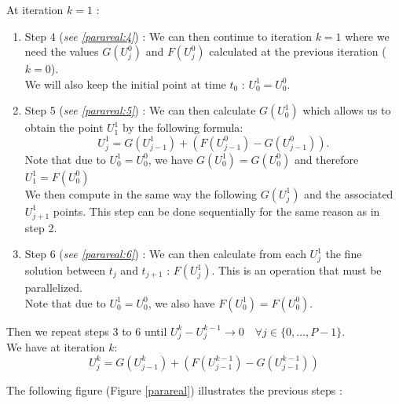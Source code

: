 \noindent At iteration $k=1$ :
\begin{enumerate}[label=\textbullet]	
	\item Step 4 (\textit{see \ref{parareal:4}}) : We can then continue to iteration $k=1$ where we need the values $G(U_j^0)$ and $F(U_j^0)$ calculated at the previous iteration ($k=0$). \\
	We will also keep the initial point at time $t_0$ : $U_0^1=U_0^0$.
	\item Step 5 (\textit{see \ref{parareal:5}}) : We can then calculate $G(U_0^1)$ which allows us to obtain the point $U_1^1$ by the following formula:
	$$U_j^1=G(U_{j-1}^1)+(F(U_{j-1}^0)-G(U_{j-1}^0)).$$
	Note that due to $U_0^1=U_0^0$, we have $G(U_0^1)=G(U_0^0)$ and therefore $U_1^1=F(U_0^0)$ \\
	We then compute in the same way the following $G(U_j^1)$ and the associated $U_{j+1}^1$ points. This step can be done sequentially for the same reason as in step 2.
	\item Step 6 (\textit{see \ref{parareal:6}}) : We can then calculate from each $U_j^1$ the fine solution between $t_j$ and $t_{j+1}$ : $F(U_j^1)$. This is an operation that must be parallelized. \\
	Note that due to $U_0^1=U_0^0$, we also have $F(U_0^1)=F(U_0^0)$.
\end{enumerate}

\noindent Then we repeat steps 3 to 6 until $U_j^k-U_j^{k-1}\rightarrow 0 \quad \forall j\in\{0,\dots,P-1\}$. \\
We have at iteration $k$:
$$U_j^k=G(U_{j-1}^k)+(F(U_{j-1}^{k-1})-G(U_{j-1}^{k-1}))$$

\noindent The following figure (Figure \ref{parareal}) illustrates the previous steps :

